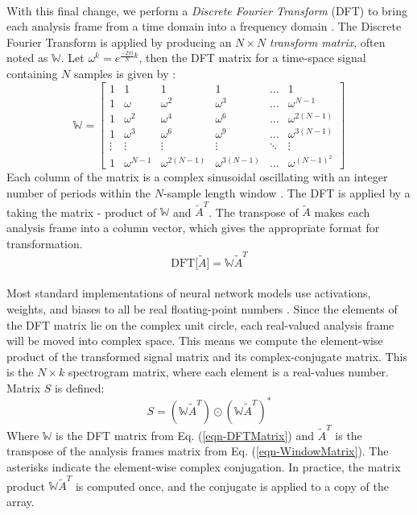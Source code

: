 \documentclass[12pt,letterpaper]{article}
\begin{document}
\paragraph*{}With this final change, we perform a \textit{Discrete Fourier Transform} (DFT) to bring each analysis frame from a time domain into a frequency domain \cite{Olson,Peatross,Virtanen}. The Discrete Fourier Transform is applied by producing an $N \times N$ \textit{transform matrix}, often noted as $\mathbb{W}$. Let $\omega^k = e^{\frac{-2\pi i}{N}k}$, then the DFT matrix for a time-space signal containing $N$ samples is given by \cite{Taylor,Peatross,Virtanen}:
\begin{equation}
\label{eqn-DFTMatrix}
\mathbb{W} = 
\begin{bmatrix}
1 & 1 & 1 & 1 & \hdots & 1 \\
1 & \omega		& \omega^2 & \omega^3 & \hdots & \omega^{N-1} \\
1 & \omega^2	& \omega^4 & \omega^6 & \hdots & \omega^{2(N-1)} \\
1 & \omega^3	& \omega^6 & \omega^9 & \hdots & \omega^{3(N-1)} \\
\vdots & \vdots & \vdots & \vdots & \ddots & \vdots \\
1 & \omega^{N-1} & \omega^{2(N-1)} & \omega^{3(N-1)} & \hdots & \omega^{(N-1)^2}
\end{bmatrix}
\end{equation}
Each column of the matrix is a complex sinusoidal oscillating with an integer number of periods within the $N$-sample length window \cite{Short,Peatross}. The DFT is applied by a taking the matrix - product of $\mathbb{W}$ and $\widetilde{A}^T$. The transpose of $\widetilde{A}$ makes each analysis frame into a column vector, which gives the appropriate format for transformation.
\begin{equation}
\label{eqn-DFT}
\text{DFT}\big[ \widetilde{A} \big] = \mathbb{W}\widetilde{A}^T
\end{equation}

\paragraph*{}Most standard implementations of neural network models use activations, weights, and biases to all be real floating-point numbers \cite{Levine,Loy,Tensorflow}. Since the elements of the DFT matrix lie on the complex unit circle, each real-valued analysis frame will be moved into complex space. This means we compute the element-wise product of the transformed signal matrix and its complex-conjugate matrix. This is the $N \times k$
spectrogram matrix, where each element is a real-values number. Matrix $S$ is defined:
\begin{equation}
\label{eqn-Spectrogram}
S = (\mathbb{W}\widetilde{A}^T) \odot (\mathbb{W}\widetilde{A}^T)^*
\end{equation}
Where $\mathbb{W}$ is the DFT matrix from Eq. (\ref{eqn-DFTMatrix}) and $\widetilde{A}^T$ is the transpose of the analysis frames matrix from Eq. (\ref{eqn-WindowMatrix}). The asterisks indicate the element-wise complex conjugation. In practice, the matrix product $\mathbb{W}\widetilde{A}^T$ is computed once, and the conjugate is applied to a copy of the array.
\end{document}
